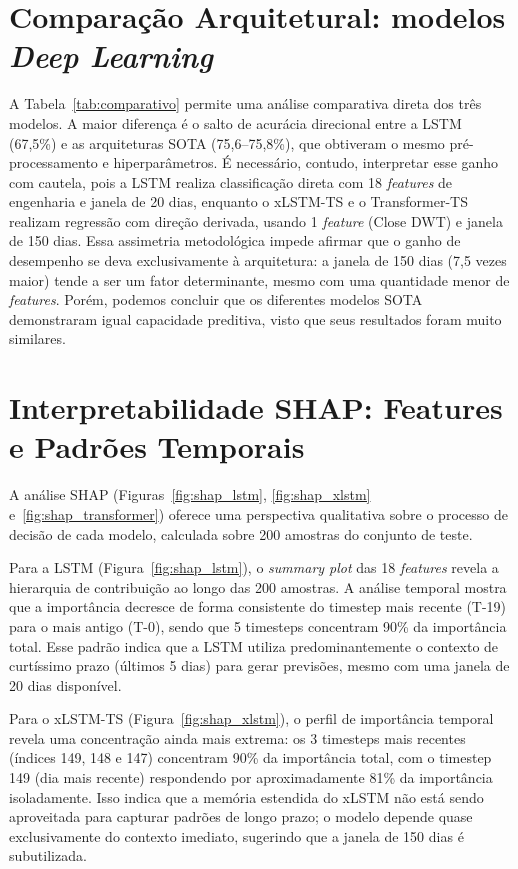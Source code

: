 \section{Comparação Arquitetural: modelos \textit{Deep Learning}}
\label{sec:disc_comparativo}

A Tabela~\ref{tab:comparativo} permite uma análise comparativa direta dos três modelos. A maior diferença é o salto de acurácia direcional entre a LSTM (67,5\%) e as arquiteturas SOTA (75,6--75,8\%), que obtiveram o mesmo pré-processamento e hiperparâmetros. É necessário, contudo, interpretar esse ganho com cautela, pois a LSTM realiza classificação direta com 18 \textit{features} de engenharia e janela de 20 dias, enquanto o xLSTM-TS e o Transformer-TS realizam regressão com direção derivada, usando 1 \textit{feature} (Close DWT) e janela de 150 dias. Essa assimetria metodológica impede afirmar que o ganho de desempenho se deva exclusivamente à arquitetura: a janela de 150 dias (7,5 vezes maior) tende a ser um fator determinante, mesmo com uma quantidade menor de \textit{features}. Porém, podemos concluir que os diferentes modelos SOTA demonstraram igual capacidade preditiva, visto que seus resultados foram muito similares.


\section{Interpretabilidade SHAP: Features e Padrões Temporais}
\label{sec:disc_shap}

A análise SHAP (Figuras~\ref{fig:shap_lstm}, \ref{fig:shap_xlstm} e~\ref{fig:shap_transformer}) oferece uma perspectiva qualitativa sobre o processo de decisão de cada modelo, calculada sobre 200 amostras do conjunto de teste.

Para a LSTM (Figura~\ref{fig:shap_lstm}), o \textit{summary plot} das 18 \textit{features} revela a hierarquia de contribuição ao longo das 200 amostras. A análise temporal mostra que a importância decresce de forma consistente do timestep mais recente (T-19) para o mais antigo (T-0), sendo que 5 timesteps concentram 90\% da importância total. Esse padrão indica que a LSTM utiliza predominantemente o contexto de curtíssimo prazo (últimos 5 dias) para gerar previsões, mesmo com uma janela de 20 dias disponível.

Para o xLSTM-TS (Figura~\ref{fig:shap_xlstm}), o perfil de importância temporal revela uma concentração ainda mais extrema: os 3 timesteps mais recentes (índices 149, 148 e 147) concentram 90\% da importância total, com o timestep 149 (dia mais recente) respondendo por aproximadamente 81\% da importância isoladamente. Isso indica que a memória estendida do xLSTM não está sendo aproveitada para capturar padrões de longo prazo; o modelo depende quase exclusivamente do contexto imediato, sugerindo que a janela de 150 dias é subutilizada.

